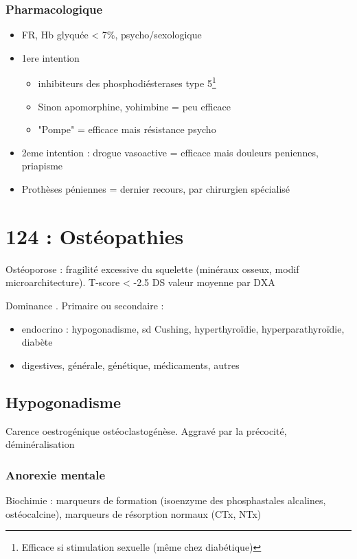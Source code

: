 \documentclass[11pt]{article}
\begin{document}
\subsubsection{Pharmacologique}
\label{sec:org1c17119}
\begin{itemize}
\item FR, Hb glyquée < 7\%, psycho/sexologique
\item 1ere intention 
\begin{itemize}
\item inhibiteurs des phosphodiésterases type 5\footnote{Efficace si stimulation sexuelle (même chez diabétique)}
\item Sinon apomorphine, yohimbine = peu efficace
\item "Pompe" = efficace mais résistance psycho
\end{itemize}
\item 2eme intention : drogue vasoactive = efficace mais douleurs peniennes, priapisme
\item Prothèses péniennes = dernier recours, par chirurgien spécialisé
\end{itemize}

\section{124 : Ostéopathies}
\label{sec:org6e982f8}
Ostéoporose : fragilité excessive du squelette (\dec minéraux osseux, modif
microarchitecture). T-score < -2.5 DS valeur moyenne par DXA

Dominance \female. Primaire ou secondaire :
\begin{itemize}
\item endocrino : hypogonadisme, sd Cushing, hyperthyroïdie, hyperparathyroïdie, diabète
\item digestives, générale, génétique, médicaments, autres
\end{itemize}

\subsection{Hypogonadisme}
\label{sec:org2775d7c}
Carence oestrogénique \inc ostéoclastogénèse. Aggravé par la précocité,
déminéralisation
\subsubsection{Anorexie mentale}
\label{sec:orgec58ac8}
Biochimie : marqueurs de formation \dec (isoenzyme des phosphastales alcalines,
ostéocalcine), marqueurs de résorption normaux (CTx, NTx) 
\end{document}
